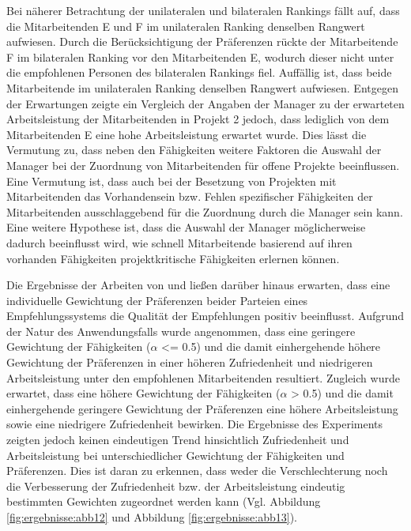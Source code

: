 Bei näherer Betrachtung der unilateralen und bilateralen Rankings fällt auf, dass die Mitarbeitenden E und F im unilateralen Ranking denselben Rangwert aufwiesen.
Durch die Berücksichtigung der Präferenzen rückte der Mitarbeitende F im bilateralen Ranking vor den Mitarbeitenden E, wodurch dieser nicht unter die empfohlenen Personen des bilateralen Rankings fiel.
Auffällig ist, dass beide Mitarbeitende im unilateralen Ranking denselben Rangwert aufwiesen.
Entgegen der Erwartungen zeigte ein Vergleich der Angaben der Manager zu der erwarteten Arbeitsleistung der Mitarbeitenden in Projekt 2 jedoch, dass lediglich von dem Mitarbeitenden E eine hohe Arbeitsleistung erwartet wurde.
Dies lässt die Vermutung zu, dass neben den Fähigkeiten weitere Faktoren die Auswahl der Manager bei der Zuordnung von Mitarbeitenden für offene Projekte beeinflussen.
Eine Vermutung ist, dass auch bei der Besetzung von Projekten mit Mitarbeitenden das Vorhandensein bzw. Fehlen spezifischer Fähigkeiten der Mitarbeitenden ausschlaggebend für die Zuordnung durch die Manager sein kann.  
Eine weitere Hypothese ist, dass die Auswahl der Manager möglicherweise dadurch beeinflusst wird, wie schnell Mitarbeitende basierend auf ihren vorhanden Fähigkeiten projektkritische Fähigkeiten erlernen können.

Die Ergebnisse der Arbeiten von \textcite[S. 131ff.]{kleinerman:2:inproceedings} und \textcite[S. 4031 ff.]{neve:inproceedings} ließen darüber hinaus erwarten, dass eine individuelle Gewichtung der Präferenzen beider Parteien eines Empfehlungssystems die Qualität der Empfehlungen positiv beeinflusst.
Aufgrund der Natur des Anwendungsfalls wurde angenommen, dass eine geringere Gewichtung der Fähigkeiten ($\alpha$ <= 0.5) und die damit einhergehende höhere Gewichtung der Präferenzen in einer höheren Zufriedenheit und niedrigeren Arbeitsleistung unter den empfohlenen Mitarbeitenden resultiert.
Zugleich wurde erwartet, dass eine höhere Gewichtung der Fähigkeiten ($\alpha$ > 0.5) und die damit einhergehende geringere Gewichtung der Präferenzen eine höhere Arbeitsleistung sowie eine niedrigere Zufriedenheit bewirken.
Die Ergebnisse des Experiments zeigten jedoch keinen eindeutigen Trend hinsichtlich Zufriedenheit und Arbeitsleistung bei unterschiedlicher Gewichtung der Fähigkeiten und Präferenzen.
Dies ist daran zu erkennen, dass weder die Verschlechterung noch die Verbesserung der Zufriedenheit bzw. der Arbeitsleistung eindeutig bestimmten Gewichten zugeordnet werden kann (Vgl. Abbildung \ref{fig:ergebnisse:abb12} und Abbildung \ref{fig:ergebnisse:abb13}).

